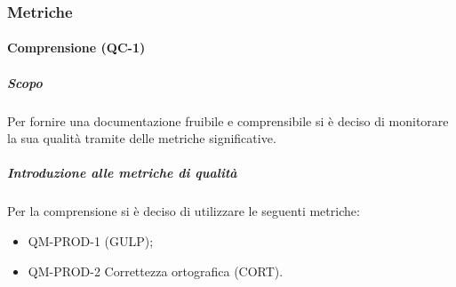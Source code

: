 		\subsubsection{Metriche}
			\paragraph{Comprensione (QC-1)}
				\subparagraph{Scopo}
				Per fornire una documentazione fruibile e comprensibile si è deciso di monitorare la sua qualità tramite delle metriche significative.
				\subparagraph{Introduzione alle metriche di qualità}
				Per la comprensione si è deciso di utilizzare le seguenti metriche:
					\begin{itemize}
						\item QM-PROD-1  (GULP);
						\item QM-PROD-2 Correttezza ortografica (CORT).
					\end{itemize}

